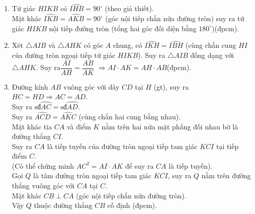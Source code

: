 \begin{bt}
{	\begin{enumerate}
	\item Tứ giác $HIKB$ có $\widehat{IHB}=90^\circ$ (theo giả thiết).\\
	Mặt khác $\widehat{IKB}=\widehat{AKB}=90^\circ$ (góc nội tiếp chắn nửa đường tròn)  suy ra tứ giác $HIKB$ nội tiếp đường tròn (tổng hai góc đối diện bằng $180^\circ$)(đpcm).
	\item  Xét $\triangle $$AIB$  và $\triangle $$AHK$  có góc $A$ chung, có $\widehat{IKH}=\widehat{IBH}$ (cùng chắn cung $HI$ của đường tròn ngoại tiếp tứ giác $HIKB$).
	Suy ra $\triangle AIB$ đồng dạng với $\triangle AHK$.
	Suy ra$\dfrac{AI}{AH}=\dfrac{AB}{AK}$  $\Rightarrow AI\cdot AK=AH\cdot AB$(đpcm).
	\item Đường kính $AB$ vuông góc với dây $CD$ tại $H$ (gt), suy ra  $HC=HD\Rightarrow AC=AD$.\\
	Suy ra $\text{sđ}\wideparen{AC}=\text{sđ}\wideparen{AD}$.\\
	Suy ra $\widehat{ACD}=\widehat{AKC}$ (cùng chắn hai cung bằng nhau).\\
	Mặt khác  tia $CA$ và điểm $K$ nằm trên hai nửa mặt phẳng đối nhau bờ là đường thẳng $CI$.\\
	Suy ra $CA$ là tiếp tuyến của đường tròn ngoại tiếp tam giác $KCI$ tại tiếp điểm $C$. \\
	(Có thể chứng minh $AC^2=AI\cdot AK$ để suy ra $CA$ là tiếp tuyến).\\
	Gọi $Q$ là tâm đường tròn ngoại tiếp tam giác $KCI$, suy ra $Q$ nằm trên đường thẳng vuông góc với $CA$ tại $C$. \\
	Mặt khác  $CB\perp CA$  (góc nội tiếp chắn nửa đường tròn).\\
	Vậy $Q$ thuộc đường thẳng $CB$ cố định (đpcm).
	\end{enumerate}
	



}
\end{bt}

